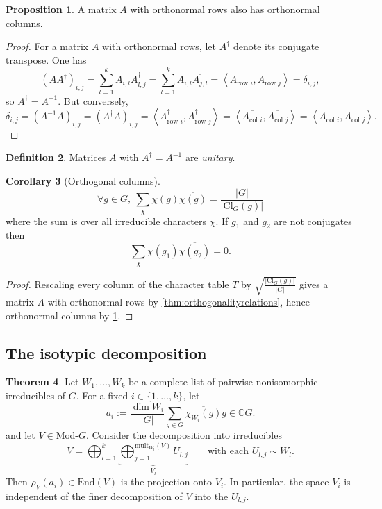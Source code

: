 \documentclass{article}
\newcommand{\mult}{\text{mult}}
\newcommand{\la}{\left\langle}
\newcommand{\ra}{\right\rangle}
\newcommand{\C}{\mathbb{C}}
\newcommand{\Cl}{\text{Cl}}
\newcommand{\End}{\text{End}}
\newcommand{\Mod}{\text{Mod-}}
\theoremstyle{definition}
\newtheorem{defn}{Definition}[subsection]
\newtheorem{prop}[defn]{Proposition}
\newtheorem{thm}[defn]{Theorem}
\newtheorem{coro}[defn]{Corollary}
\begin{document}
\begin{prop}
\label{prop:onRimponC}
A matrix $A$ with orthonormal rows also has orthonormal columns.
\end{prop}
\begin{proof}
For a matrix $A$ with orthonormal rows, let $A^\dagger$ denote its conjugate transpose. One has
\[
(AA^\dagger)_{i,j}=\sum_{l=1}^k A_{i,l}A^\dagger_{l,j}=\sum_{l=1}^k A_{i,l} \overline{A_{j,l}}=\la A_{\text{row }i},A_{\text{row }j}\ra=\delta_{i,j},
\]
so $A^\dagger=A^{-1}$. But conversely,
\[
\delta_{i,j}=(A^{-1}A)_{i,j}=(A^\dagger A)_{i,j}=\la A^\dagger_{\text{row }i},A^\dagger_{\text{row }j} \ra=\la \overline{A_{\text{col }i}},\overline{A_{\text{col }j}} \ra=\la A_{\text{col }i},A_{\text{col }j} \ra.
\]
\end{proof}
\begin{defn}
Matrices $A$ with $A^\dagger=A^{-1}$ are \textit{unitary}.
\end{defn}
\begin{coro}[Orthogonal columns]
\[
\forall g\in G,\ \sum_\chi \chi(g)\overline{\chi(g)}=\frac{|G|}{|\Cl_G(g)|}
\]
where the sum is over all irreducible characters $\chi$. If $g_1$ and $g_2$ are not conjugates then
\[
\sum_\chi \chi(g_1)\overline{\chi(g_2)}=0.
\]
\end{coro}
\begin{proof}
Rescaling every column of the character table $T$ by $\sqrt{\frac{|\Cl_G(g)|}{|G|}}$ gives a matrix $A$ with orthonormal rows by \ref{thm:orthogonalityrelations}, hence orthonormal columns by \ref{prop:onRimponC}.
\end{proof}

\subsection{The isotypic decomposition}
\begin{thm}
\label{thm:isotypicdecomp}
Let $W_1,\ldots,W_k$ be a complete list of pairwise nonisomorphic irreducibles of $G$. For a fixed $i\in\{1,\ldots,k\}$, let
\[
a_i:=\frac{\dim W_i}{|G|}\sum_{g\in G}\overline{\chi_{W_i}(g)}g \in\C G.
\]
and let $V\in\Mod G$. Consider the decomposition into irreducibles
\[
V=\bigoplus_{l=1}^k \underbrace{\bigoplus_{j=1}^{\mult_{W_l}(V)} U_{l,j}}_{V_l}\qquad\text{with each }U_{l,j}\sim W_l.
\]
Then $\rho_V(a_i)\in\End(V)$ is the projection onto $V_i$. In particular, the space $V_i$ is independent of the finer decomposition of $V$ into the $U_{l,j}$.
\end{thm}
\end{document}
